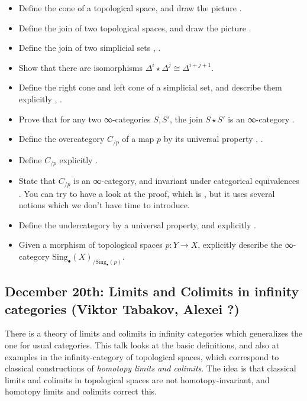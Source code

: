 \documentclass{amsart}
\theoremstyle{definition}
\theoremstyle{remark}
\begin{document}
\begin{itemize}
\item Define the cone of a topological space, and draw the picture \cite[pp.8-9]{Hat}. %
\item Define the join of two topological spaces, and draw the picture \cite[p.9]{Hat}. %
\item Define the join of two simplicial sets \cite[Def.2.11]{Groth}, \cite[Def.1.2.8.1]{HTT}. %
\item Show that there are isomorphisms $\Delta^{i} {\star} \Delta^{j} \cong \Delta^{i+j+1}$. %
\item Define the right cone and left cone of a simplicial set, and describe them explicitly \cite[Ex.2.14]{Groth}, \cite[Not.1.2.8.4]{HTT}. %
\item Prove that for any two ∞-categories $S, S'$, the join $S \star S'$ is an ∞-category \cite[Prop.1.2.8.3]{HTT}. %
\item Define the overcategory  $C_{/p}$ of a map $p$ by its universal property \cite[Prop.2.17]{Groth}, \cite[Prop.1.2.9.2]{HTT}. %
\item Define $C_{/p}$  explicitly \cite[Proof of Prop.1.2.9.2]{HTT}. %
\item State that $C_{/p}$ is an ∞-category, and invariant under categorical equivalences \cite[Prop.1.2.9.3]{HTT}. You can try to have a look at the proof, which is \cite[Cor. 2.1.2.2]{HTT}, but it uses several notions which we don't have time to introduce.
\item Define the undercategory by a universal property, and explicitly \cite[Rem.1.2.9.5]{HTT}. %
\item Given a morphism of topological spaces $p: Y \to X$, explicitly describe the ∞-category $\mathrm{Sing}_\bullet(X)_{/\mathrm{Sing}_{\bullet}(p)}$. %
\end{itemize}  

\subsection{December 20th:  Limits and Colimits in infinity categories (Viktor Tabakov, Alexei ?)}

There is a theory of limits and colimits in infinity categories which generalizes the one for usual categories. This talk looks at the basic definitions, and also at examples in the infinity-category of topological spaces, which correspond to classical constructions of \emph{homotopy limits and colimits}. The idea is that classical limits and colimits in topological spaces are not homotopy-invariant, and homotopy limits and colimits correct this.
\end{document}
